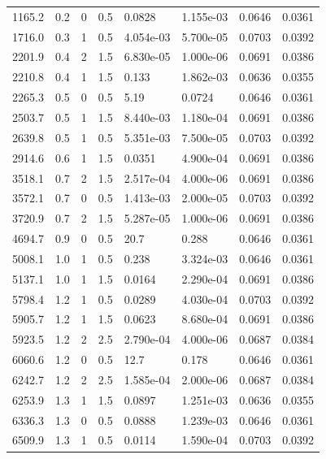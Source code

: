 \documentclass[preview]{standalone}
\begin{document}
{{\begin{tabular}{L{1.2cm}C{1.2cm} C{0.3cm}C{0.5cm} C{1.4cm}C{1.4cm} C{1.4cm}C{1.4cm}}
  1165.2  &   0.2  & 0     & 0.5 &  0.0828  & 1.155e-03  & 0.0646 &  0.0361   \\ 
  1716.0  &   0.3  & 1     & 0.5 &  4.054e-03  & 5.700e-05  & 0.0703 &  0.0392   \\ 
  2201.9  &   0.4  & 2     & 1.5 &  6.830e-05  & 1.000e-06  & 0.0691 &  0.0386   \\ 
  2210.8  &   0.4  & 1     & 1.5 &  0.133  & 1.862e-03  & 0.0636 &  0.0355   \\ 
  2265.3  &   0.5  & 0     & 0.5 &  5.19  & 0.0724  & 0.0646 &  0.0361   \\ 
  2503.7  &   0.5  & 1     & 1.5 &  8.440e-03  & 1.180e-04  & 0.0691 &  0.0386   \\ 
  2639.8  &   0.5  & 1     & 0.5 &  5.351e-03  & 7.500e-05  & 0.0703 &  0.0392   \\ 
  2914.6  &   0.6  & 1     & 1.5 &  0.0351  & 4.900e-04  & 0.0691 &  0.0386   \\ 
  3518.1  &   0.7  & 2     & 1.5 &  2.517e-04  & 4.000e-06  & 0.0691 &  0.0386   \\ 
  3572.1  &   0.7  & 0     & 0.5 &  1.413e-03  & 2.000e-05  & 0.0703 &  0.0392   \\ 
  3720.9  &   0.7  & 2     & 1.5 &  5.287e-05  & 1.000e-06  & 0.0691 &  0.0386   \\ 
  4694.7  &   0.9  & 0     & 0.5 &  20.7  & 0.288  & 0.0646 &  0.0361   \\ 
  5008.1  &   1.0  & 1     & 0.5 &  0.238  & 3.324e-03  & 0.0646 &  0.0361   \\ 
  5137.1  &   1.0  & 1     & 1.5 &  0.0164  & 2.290e-04  & 0.0691 &  0.0386   \\ 
  5798.4  &   1.2  & 1     & 0.5 &  0.0289  & 4.030e-04  & 0.0703 &  0.0392   \\ 
  5905.7  &   1.2  & 1     & 1.5 &  0.0623  & 8.680e-04  & 0.0691 &  0.0386   \\ 
  5923.5  &   1.2  & 2     & 2.5 &  2.790e-04  & 4.000e-06  & 0.0687 &  0.0384   \\ 
  6060.6  &   1.2  & 0     & 0.5 &  12.7  & 0.178  & 0.0646 &  0.0361   \\ 
  6242.7  &   1.2  & 2     & 2.5 &  1.585e-04  & 2.000e-06  & 0.0687 &  0.0384   \\ 
  6253.9  &   1.3  & 1     & 1.5 &  0.0897  & 1.251e-03  & 0.0636 &  0.0355   \\ 
  6336.3  &   1.3  & 0     & 0.5 &  0.0888  & 1.239e-03  & 0.0646 &  0.0361   \\ 
  6509.9  &   1.3  & 1     & 0.5 &  0.0114  & 1.590e-04  & 0.0703 &  0.0392   \\ 

\end{tabular}}}
\end{document}

